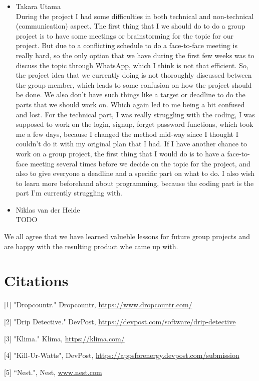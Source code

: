 \documentclass[10pt]{article}
\begin{document}
\begin{multicols*}{2}
\begin{itemize}
  \item {Takara Utama}\\
  During the project I had some difficulties in both technical and non-technical (communication) aspect. The first thing that I we should do to do a group project is to have some meetings or brainstorming for the topic for our project. But due to a conflicting schedule to do a face-to-face meeting is really hard, so the only option that we have during the first few weeks was to discuss the topic through WhatsApp, which I think is not that efficient. So, the project idea that we currently doing is not thoroughly discussed between the group member, which leads to some confusion on how the project should be done. We also don’t have such things like a target or deadline to do the parts that we should work on. Which again led to me being a bit confused and lost. For the technical part, I was really struggling with the coding, I was supposed to work on the login, signup, forget password functions, which took me a few days, because I changed the method mid-way since I thought I couldn’t do it with my original plan that I had. If I have another chance to work on a group project, the first thing that I would do is to have a face-to-face meeting several times before we decide on the topic for the project, and also to give everyone a deadline and a specific part on what to do. I also wish to learn more beforehand about programming, because the coding part is the part I'm currently struggling with. 
  
  \item {Niklas van der Heide}\\
  TODO
\end{itemize}

We all agree that we have learned valueble lessons for future group projects and are happy with the resulting product whe came up with.

\end{multicols*}

\clearpage
\section{Citations}
[1] "Dropcountr." Dropcountr, \href{https://www.dropcountr.com/}{https://www.dropcountr.com/}

[2] "Drip Detective." DevPost, \href{https://devpost.com/software/drip-detective}{https://devpost.com/software/drip-detective}

[3] "Klima." Klima, \href{https://klima.com/}{https://klima.com/}

[4] "Kill-Ur-Watts", DevPost, \href{https://appsforenergy.devpost.com/submission}{https://appsforenergy.devpost.com/submission}

[5] “Nest.", Nest, \href{http://www.nest.com}{www.nest.com}
\end{document}
